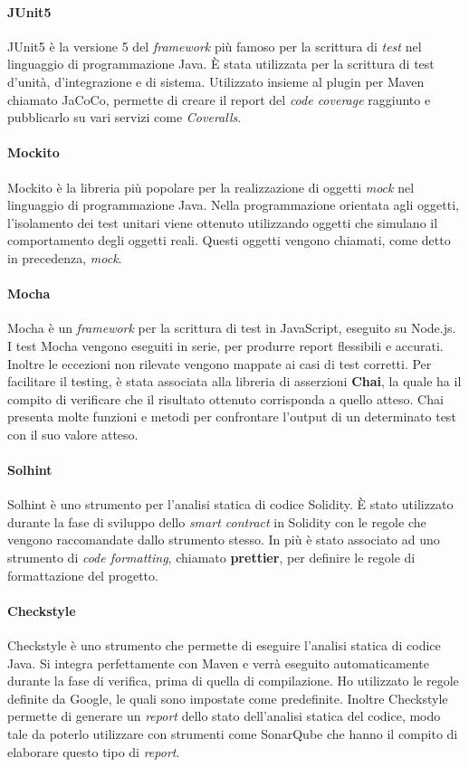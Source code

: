 \paragraph{JUnit5}

JUnit5 è la versione 5 del \textit{framework} più famoso per la scrittura di \textit{test} nel linguaggio di programmazione Java. È stata utilizzata per la scrittura di test d'unità, d'integrazione e di sistema. Utilizzato insieme al plugin per Maven chiamato JaCoCo, permette di creare il report del \textit{code coverage} raggiunto e pubblicarlo su vari servizi come \textit{Coveralls}.

\paragraph{Mockito}
Mockito è la libreria più popolare per la realizzazione di oggetti \textit{mock} nel linguaggio di programmazione Java. Nella programmazione orientata agli oggetti, l'isolamento dei test unitari viene ottenuto utilizzando oggetti che simulano il comportamento degli oggetti reali. Questi oggetti vengono chiamati, come detto in precedenza, \textit{mock}.

\paragraph{Mocha}
Mocha è un \textit{framework} per la scrittura di test in JavaScript, eseguito su Node.js. I test Mocha vengono eseguiti in serie, per produrre report flessibili e accurati. Inoltre le eccezioni non rilevate vengono mappate ai casi di test corretti. Per facilitare il testing, è stata associata alla libreria di asserzioni \textbf{Chai}, la quale ha il compito di verificare che il risultato ottenuto corrisponda a quello atteso. Chai presenta molte funzioni e metodi per confrontare l'output di un determinato test con il suo valore atteso.

\paragraph{Solhint}
Solhint è uno strumento per l'analisi statica di codice Solidity. È stato utilizzato durante la fase di sviluppo dello \textit{smart contract} in Solidity con le regole che vengono raccomandate dallo strumento stesso. In più è stato associato ad uno strumento di \textit{code formatting}, chiamato \textbf{prettier}, per definire le regole di formattazione del progetto.


\paragraph{Checkstyle}
Checkstyle è uno strumento che permette di eseguire l'analisi statica di codice Java. Si integra perfettamente con Maven e verrà eseguito automaticamente durante la fase di verifica, prima di quella di compilazione. Ho utilizzato le regole definite da Google, le quali sono impostate come predefinite.
Inoltre Checkstyle permette di generare un \textit{report} dello stato dell'analisi statica del codice, modo tale da poterlo utilizzare con strumenti come SonarQube che hanno il compito di elaborare questo tipo di \textit{report}.


